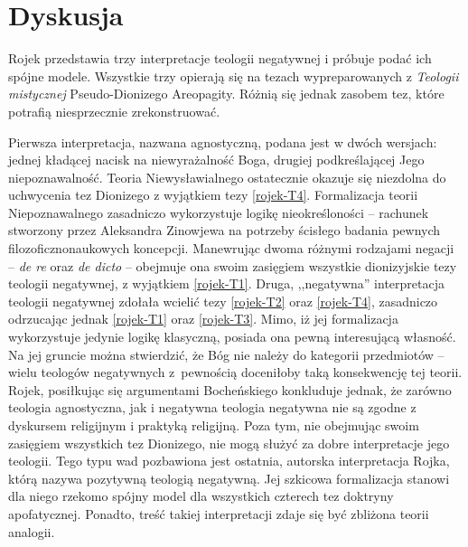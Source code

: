 \section{Dyskusja}\label{roj-dyskusja}

Rojek przedstawia trzy interpretacje teologii negatywnej i próbuje podać
ich spójne modele. Wszystkie trzy opierają się na tezach
wypreparowanych z \textit{Teologii mistycznej} Pseudo-Dionizego
Areopagity. Różnią się jednak zasobem tez, które potrafią niesprzecznie
zrekonstruować.

Pierwsza interpretacja, nazwana agnostyczną, podana jest w dwóch
wersjach: jednej kładącej nacisk na niewyrażalność Boga, drugiej
podkreślającej Jego niepoznawalność. Teoria Niewysławialnego ostatecznie okazuje
się niezdolna do uchwycenia tez Dionizego z wyjątkiem tezy \eqref{rojek-T4}.
Formalizacja teorii Niepoznawalnego zasadniczo wykorzystuje logikę
nieokreśloności -- rachunek stworzony przez Aleksandra Zinowjewa na
potrzeby ścisłego badania pewnych filozoficznonaukowych koncepcji.
Manewrując dwoma różnymi rodzajami negacji -- \textit{de re} oraz
\textit{de dicto} -- obejmuje ona swoim zasięgiem wszystkie dionizyjskie
tezy teologii negatywnej, z wyjątkiem \eqref{rojek-T1}.
%
Druga, ,,negatywna'' interpretacja teologii negatywnej zdołała wcielić
tezy \eqref{rojek-T2} oraz \eqref{rojek-T4}, zasadniczo odrzucając jednak \eqref{rojek-T1} oraz \eqref{rojek-T3}. Mimo,
iż jej formalizacja wykorzystuje jedynie logikę klasyczną, posiada ona
pewną interesującą własność. Na jej gruncie można stwierdzić, że Bóg
nie należy do kategorii przedmiotów -- wielu teologów negatywnych z~pewnością doceniłoby taką konsekwencję tej teorii.  Rojek, posiłkując się argumentami Bocheńskiego konkluduje jednak, że zarówno
teologia agnostyczna, jak i negatywna teologia negatywna nie są zgodne z
dyskursem religijnym i praktyką religijną. Poza tym, nie obejmując
swoim zasięgiem wszystkich tez Dionizego, nie mogą służyć za dobre
interpretacje jego teologii.
%
Tego typu wad pozbawiona jest ostatnia, autorska
interpretacja Rojka, którą nazywa pozytywną teologią negatywną. Jej szkicowa
formalizacja stanowi dla niego rzekomo spójny model dla wszystkich czterech tez doktryny
apofatycznej. Ponadto, treść takiej interpretacji zdaje się być zbliżona teorii analogii.

